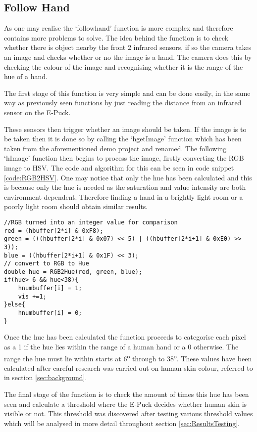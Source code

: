 \subsection{Follow Hand}

As one may realise the `followhand' function is more complex and therefore contains more problems to solve. The idea behind the function is to check whether there is object nearby the front 2 infrared sensors, if so the camera takes an image and checks whether or no the image is a hand. The camera does this by checking the colour of the image and recognising whether it is the range of the hue of a hand.

The first stage of this function is very simple and can be done easily, in the same way as previously seen functions by just reading the distance from an infrared sensor on the E-Puck.

These sensors then trigger whether an image should be taken. If the image is to be taken then it is done so by calling the `hgetImage' function which has been taken from the aforementioned demo project and renamed. The following `hImage' function then begins to process the image, firstly converting the RGB image to HSV. The code and algorithm for this can be seen in code snippet \ref{code:RGB2HSV}. One may notice that only the hue has been calculated and this is because only the hue is needed as the saturation and value intensity are both environment dependent. Therefore finding a hand in a brightly light room or a poorly light room should obtain similar results.

\vspace{5mm}
\begin{lstlisting}[caption={Converting RGB pixels to HSV},label=code:RGB2HSV,float]
//RGB turned into an integer value for comparison
red = (hbuffer[2*i] & 0xF8);
green = (((hbuffer[2*i] & 0x07) << 5) | ((hbuffer[2*i+1] & 0xE0) >> 3));
blue = ((hbuffer[2*i+1] & 0x1F) << 3);
// convert to RGB to Hue
double hue = RGB2Hue(red, green, blue);
if(hue> 6 && hue<38){
	hnumbuffer[i] = 1;
	vis +=1;
}else{
	hnumbuffer[i] = 0;
}
\end{lstlisting}

Once the hue has been calculated the function proceeds to categorise each pixel as a 1 if the hue lies within the range of a human hand or a 0 otherwise. The range the hue must lie within starts at 6\textsuperscript{o} through to 38\textsuperscript{o}. These values have been calculated after careful research was carried out on human skin colour, referred to in section \ref{sec:background}.

The final stage of the function is to check the amount of times this hue has been seen and calculate a threshold where the E-Puck decides whether human skin is visible or not. This threshold was discovered after testing various threshold values which will be analysed in more detail throughout section \ref{sec:ResultsTesting}. 
